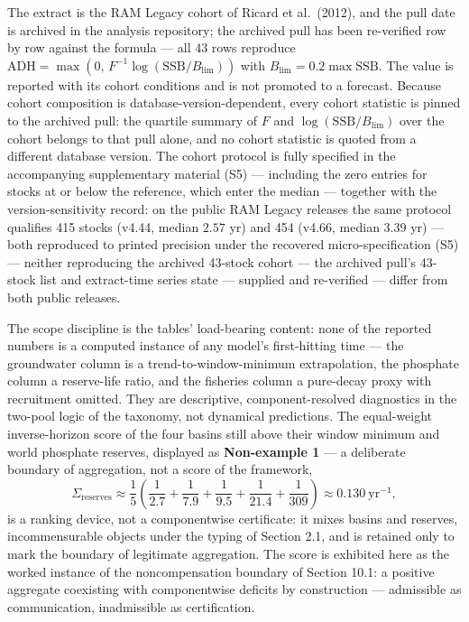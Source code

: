 \documentclass[11pt]{article}
\begin{document}
The extract is the RAM Legacy cohort of Ricard et al.~(2012), and the
pull date is archived in the analysis repository; the archived pull has
been re-verified row by row against the formula --- all 43 rows
reproduce
\(\mathrm{ADH} = \max(0,\, F^{-1}\log(\mathrm{SSB}/B_{\lim}))\) with
\(B_{\lim} = 0.2 \max \mathrm{SSB}\). The value is reported with its
cohort conditions and is not promoted to a forecast. Because cohort
composition is database-version-dependent, every cohort statistic is
pinned to the archived pull: the quartile summary of \(F\) and
\(\log(\mathrm{SSB}/B_{\lim})\) over the cohort belongs to that pull
alone, and no cohort statistic is quoted from a different database
version. The cohort protocol is fully specified in the accompanying
supplementary material (S5) --- including the zero entries for stocks at
or below the reference, which enter the median --- together with the
version-sensitivity record: on the public RAM Legacy releases the same
protocol qualifies 415 stocks (v4.44, median \(2.57\) yr) and 454
(v4.66, median \(3.39\) yr) --- both reproduced to printed precision
under the recovered micro-specification (S5) --- neither reproducing the
archived 43-stock cohort --- the archived pull's 43-stock list and
extract-time series state --- supplied and re-verified --- differ from
both public releases.

The scope discipline is the tables' load-bearing content: none of the
reported numbers is a computed instance of any model's first-hitting
time --- the groundwater column is a trend-to-window-minimum
extrapolation, the phosphate column a reserve-life ratio, and the
fisheries column a pure-decay proxy with recruitment omitted. They are
descriptive, component-resolved diagnostics in the two-pool logic of the
taxonomy, not dynamical predictions. The equal-weight inverse-horizon
score of the four basins still above their window minimum and world
phosphate reserves, displayed as \textbf{Non-example 1} --- a deliberate
boundary of aggregation, not a score of the framework,
\[\Sigma_{\mathrm{reserves}} \approx \frac{1}{5}\left( \frac{1}{2.7} + \frac{1}{7.9} + \frac{1}{9.5} + \frac{1}{21.4} + \frac{1}{309} \right) \approx 0.130\ \mathrm{yr}^{-1},\]
is a ranking device, not a componentwise certificate: it mixes basins
and reserves, incommensurable objects under the typing of Section 2.1,
and is retained only to mark the boundary of legitimate aggregation. The
score is exhibited here as the worked instance of the noncompensation
boundary of Section 10.1: a positive aggregate coexisting with
componentwise deficits by construction --- admissible as communication,
inadmissible as certification.
\end{document}
